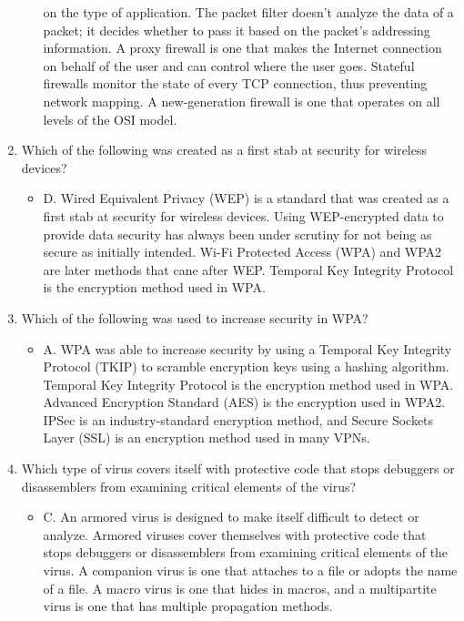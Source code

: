 \documentclass{article}
\begin{document}
\begin{enumerate}
\begin{itemize}
on the type of application. The packet filter doesn’t analyze the data of a packet; it decides
whether to pass it based on the packet’s addressing information. A proxy firewall is one
that makes the Internet connection on behalf of the user and can control where the user
goes. Stateful firewalls monitor the state of every TCP connection, thus preventing network
mapping. A new-generation firewall is one that operates on all levels of the OSI model.
    \end{itemize}
    \item Which of the following was created as a first stab at security for wireless devices?
    \begin{itemize}
        \item D. Wired Equivalent Privacy (WEP) is a standard that was created as a first stab at security
for wireless devices. Using WEP-encrypted data to provide data security has always been
under scrutiny for not being as secure as initially intended. Wi-Fi Protected Access (WPA)
and WPA2 are later methods that cane after WEP. Temporal Key Integrity Protocol is the
encryption method used in WPA.
    \end{itemize}
    \item Which of the following was used to increase security in WPA?
    \begin{itemize}
        \item A. WPA was able to increase security by using a Temporal Key Integrity Protocol (TKIP) to
scramble encryption keys using a hashing algorithm. Temporal Key Integrity Protocol is the
encryption method used in WPA. Advanced Encryption Standard (AES) is the encryption
used in WPA2. IPSec is an industry-standard encryption method, and Secure Sockets Layer
(SSL) is an encryption method used in many VPNs.
    \end{itemize}
    \item Which type of virus covers itself with protective code that stops debuggers or disassemblers
from examining critical elements of the virus?
    \begin{itemize}
        \item  C. An armored virus is designed to make itself difficult to detect or analyze. Armored
viruses cover themselves with protective code that stops debuggers or disassemblers from
examining critical elements of the virus. A companion virus is one that attaches to a file
or adopts the name of a file. A macro virus is one that hides in macros, and a multipartite
virus is one that has multiple propagation methods.

\end{itemize}
\end{enumerate}
\end{document}
